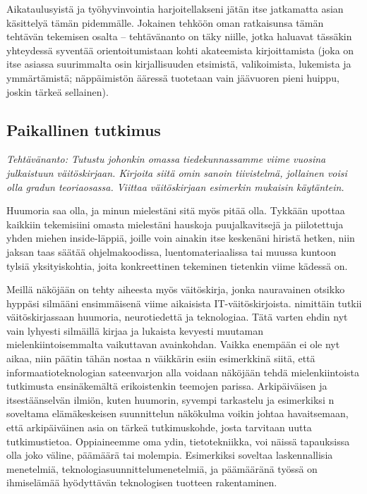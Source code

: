 \documentclass[utf8]{gradu3}
\begin{document}
Aikataulusyistä ja työhyvinvointia harjoitellakseni jätän itse
jatkamatta asian käsittelyä tämän pidemmälle.
%
Jokainen tehköön oman ratkaisunsa tämän tehtävän tekemisen osalta --
tehtävänanto on täky niille, jotka haluavat tässäkin yhteydessä
syventää orientoitumistaan kohti akateemista kirjoittamista (joka on
itse asiassa suurimmalta osin kirjallisuuden etsimistä, valikoimista,
lukemista ja ymmärtämistä; näppäimistön ääressä tuotetaan vain
jäävuoren pieni huippu, joskin tärkeä sellainen).

\subsection{Paikallinen tutkimus}

\textit{Tehtävänanto: Tutustu johonkin omassa tiedekunnassamme viime
  vuosina julkaistuun väitöskirjaan. Kirjoita siitä omin sanoin
  tiivistelmä, jollainen voisi olla gradun teoriaosassa. Viittaa
  väitöskirjaan esimerkin mukaisin käytäntein.}

Huumoria saa olla, ja minun mielestäni sitä myös pitää
olla.
%
Tykkään upottaa kaikkiin tekemisiini omasta mielestäni hauskoja
puujalkavitsejä ja piilotettuja yhden miehen inside-läppiä, joille
voin ainakin itse keskenäni hiristä hetken, niin jaksan taas säätää
ohjelmakoodissa, luentomateriaalissa tai muussa kuntoon tylsiä
yksityiskohtia, joita konkreettinen tekeminen tietenkin viime kädessä
on.

Meillä näköjään on tehty aiheesta myös väitöskirja, jonka nauravainen
otsikko hyppäsi silmääni ensimmäisenä viime aikaisista
IT-väitöskirjoista. \textcite{Li2018haha} nimittäin tutkii
väitöskirjassaan huumoria, neurotiedettä ja teknologiaa. Tätä varten
ehdin nyt vain lyhyesti silmäillä kirjaa ja lukaista kevyesti muutaman
mielenkiintoisemmalta vaikuttavan avainkohdan. Vaikka enempään ei ole
nyt aikaa, niin päätin tähän nostaa \citeauthor{Li2018haha}n väikkärin
esiin esimerkkinä siitä, että informaatioteknologian sateenvarjon alla
voidaan näköjään tehdä mielenkiintoista tutkimusta ensinäkemältä
erikoistenkin teemojen parissa. Arkipäiväisen ja itsestäänselvän
ilmiön, kuten huumorin, syvempi tarkastelu ja esimerkiksi
\citeauthor{Li2018haha}n \parencite*{Li2018haha} soveltama
elämäkeskeisen suunnittelun näkökulma voikin johtaa havaitsemaan, että
arkipäiväinen asia on tärkeä tutkimuskohde, josta tarvitaan uutta
tutkimustietoa. Oppiaineemme oma ydin, tietotekniikka, voi näissä
tapauksissa olla joko väline, päämäärä tai molempia. Esimerkiksi
\textcite{Li2018haha} soveltaa laskennallisia menetelmiä,
teknologiasuunnittelumenetelmiä, ja päämääränä työssä on ihmiselämää
hyödyttävän teknologisen tuotteen rakentaminen.
\end{document}
